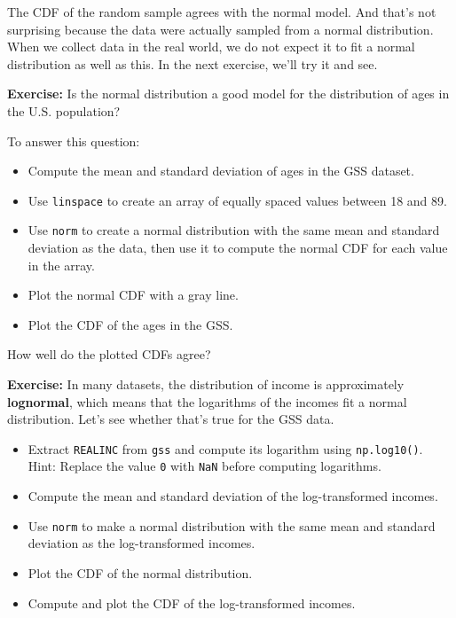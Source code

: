 The CDF of the random sample agrees with the normal model. And that's
not surprising because the data were actually sampled from a normal
distribution. When we collect data in the real world, we do not expect
it to fit a normal distribution as well as this. In the next exercise,
we'll try it and see.

\textbf{Exercise:} Is the normal distribution a good model for the
distribution of ages in the U.S. population?

To answer this question:

\begin{itemize}
\item
  Compute the mean and standard deviation of ages in the GSS dataset.
\item
  Use \passthrough{\lstinline!linspace!} to create an array of equally
  spaced values between 18 and 89.
\item
  Use \passthrough{\lstinline!norm!} to create a normal distribution
  with the same mean and standard deviation as the data, then use it to
  compute the normal CDF for each value in the array.
\item
  Plot the normal CDF with a gray line.
\item
  Plot the CDF of the ages in the GSS.
\end{itemize}

How well do the plotted CDFs agree?

\textbf{Exercise:} In many datasets, the distribution of income is
approximately \textbf{lognormal}, which means that the logarithms of the
incomes fit a normal distribution. Let's see whether that's true for the
GSS data.

\begin{itemize}
\item
  Extract \passthrough{\lstinline!REALINC!} from
  \passthrough{\lstinline!gss!} and compute its logarithm using
  \passthrough{\lstinline!np.log10()!}. Hint: Replace the value
  \passthrough{\lstinline!0!} with \passthrough{\lstinline!NaN!} before
  computing logarithms.
\item
  Compute the mean and standard deviation of the log-transformed
  incomes.
\item
  Use \passthrough{\lstinline!norm!} to make a normal distribution with
  the same mean and standard deviation as the log-transformed incomes.
\item
  Plot the CDF of the normal distribution.
\item
  Compute and plot the CDF of the log-transformed incomes.
\end{itemize}

